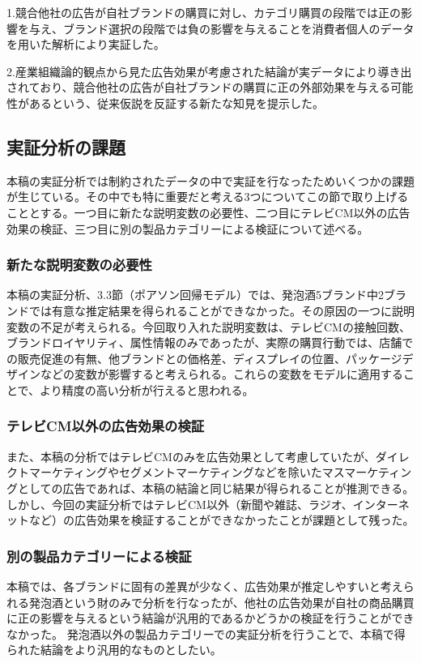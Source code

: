 \documentclass[11pt]{jsarticle}
\begin{document}
1.競合他社の広告が自社ブランドの購買に対し、カテゴリ購買の段階では正の影響を与え、ブランド選択の段階では負の影響を与えることを消費者個人のデータを用いた解析により実証した。

2.産業組織論的観点から見た広告効果が考慮された結論が実データにより導き出されており、競合他社の広告が自社ブランドの購買に正の外部効果を与える可能性があるという、従来仮説を反証する新たな知見を提示した。

\subsection{実証分析の課題}
\label{sec:issue}
本稿の実証分析では制約されたデータの中で実証を行なったためいくつかの課題が生じている。その中でも特に重要だと考える3つについてこの節で取り上げることとする。一つ目に新たな説明変数の必要性、二つ目にテレビCM以外の広告効果の検証、三つ目に別の製品カテゴリーによる検証について述べる。

\subsubsection{新たな説明変数の必要性}
\label{subsec:issue1}
本稿の実証分析、3.3節（ポアソン回帰モデル）では、発泡酒5ブランド中2ブランドでは有意な推定結果を得られることができなかった。その原因の一つに説明変数の不足が考えられる。今回取り入れた説明変数は、テレビCMの接触回数、ブランドロイヤリティ、属性情報のみであったが、実際の購買行動では、店舗での販売促進の有無、他ブランドとの価格差、ディスプレイの位置、パッケージデザインなどの変数が影響すると考えられる。これらの変数をモデルに適用することで、より精度の高い分析が行えると思われる。

\subsubsection{テレビCM以外の広告効果の検証}
 \label{subsec:issue2}
また、本稿の分析ではテレビCMのみを広告効果として考慮していたが、ダイレクトマーケティングやセグメントマーケティングなどを除いたマスマーケティングとしての広告であれば、本稿の結論と同じ結果が得られることが推測できる。
しかし、今回の実証分析ではテレビCM以外（新聞や雑誌、ラジオ、インターネットなど）の広告効果を検証することができなかったことが課題として残った。

\subsubsection{別の製品カテゴリーによる検証}
 \label{issue3}
本稿では、各ブランドに固有の差異が少なく、広告効果が推定しやすいと考えられる発泡酒という財のみで分析を行なったが、他社の広告効果が自社の商品購買に正の影響を与えるという結論が汎用的であるかどうかの検証を行うことができなかった。
発泡酒以外の製品カテゴリーでの実証分析を行うことで、本稿で得られた結論をより汎用的なものとしたい。
\end{document}

